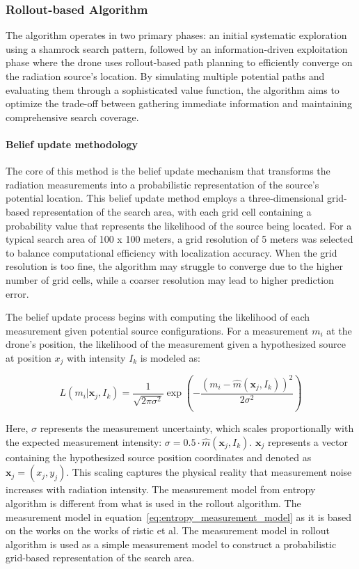 \documentclass[../report.tex]{subfiles}
\begin{document}
    \subsubsection{Rollout-based Algorithm}
    The algorithm operates in two primary phases: an initial systematic exploration using a shamrock search pattern, followed by an information-driven exploitation 
    phase where the drone uses rollout-based path planning to efficiently converge on the radiation source's location. By simulating multiple potential paths and 
    evaluating them through a sophisticated value function, the algorithm aims to optimize the trade-off between gathering immediate information and maintaining 
    comprehensive search coverage.
    \paragraph{Belief update methodology}
    The core of this method is the belief update mechanism that transforms the radiation measurements into a probabilistic representation of the source's potential location. This belief update 
    method employs a three-dimensional grid-based representation of the search area, with each grid cell containing a probability value that represents the likelihood of the source being located.
    For a typical search area of 100 x 100 meters, a grid resolution of 5 meters was selected to balance computational efficiency with localization accuracy. When the grid 
    resolution is too fine, the algorithm may struggle to converge due to the higher number of grid cells, while a coarser resolution may lead to higher prediction error.

    The belief update process begins with computing the likelihood of each measurement given potential source configurations. For a measurement $m_i$ at the drone's position, the likelihood of 
    the measurement given a hypothesized source at position $x_j$ with intensity $I_k$ is modeled as:

    \begin{equation}
        L(m_i | \mathbf{x}_j, I_k) = \frac{1}{\sqrt{2\pi\sigma^2}} \exp\left(-\frac{(m_i - \hat{m}(\mathbf{x}_j, I_k))^2}{2\sigma^2}\right)
        \label{eq:rollout_likelihood}
    \end{equation}
    
    Here, $\sigma$ represents the measurement uncertainty, which scales proportionally with the expected measurement intensity: $\sigma = 0.5 \cdot \hat{m}(\mathbf{x}_j, I_k)$. 
    $\mathbf{x}_j$ represents a vector containing the hypothesized source position coordinates and denoted as $\mathbf{x}_j = (x_j, y_j)$. This scaling captures the physical reality that measurement 
    noise increases with radiation intensity. The measurement model from entropy algorithm is different from what is used in the rollout algorithm. The measurement 
    model in  equation~\ref{eq:entropy_measurement_model} as it is based on the works on the works of ristic et al. The measurement model in rollout algorithm 
    is used as a simple measurement model to construct a probabilistic grid-based representation of the search area.
\end{document}
